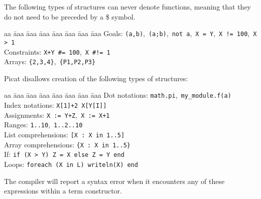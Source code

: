 The following types of structures can never denote functions, meaning that they do not need to be preceded by a \$ symbol.
\begin{tabbing}
aa \= aaa \= aaa \= aaa \=aaa \= aaa \= aaa \= aaa \kill
\> Goals:  \>  \> \> \> \> \> \texttt{(a,b)},\ \texttt{(a;b)},\ \texttt{not a},\ \texttt{X = Y},\ \verb-X != 100-,\ \verb+X > 1+ \\
\> Constraints:  \>  \> \> \> \> \> \verb-X+Y #= 100-,\ \verb+X #!= 1+ \\
\> Arrays:  \>  \> \> \> \> \> \verb+{2,3,4}+,\ \verb+{P1,P2,P3}+ \\
\end{tabbing}
Picat disallows creation of the following types of structures:
\begin{tabbing}
aa \= aaa \= aaa \= aaa \= aaa \= aaa \= aaa \= aaa \kill
\> Dot notations:  \>  \> \> \> \> \> \texttt{math.pi},\ \texttt{my\_module.f(a)} \\
\> Index notations:  \>  \> \> \> \> \> \texttt{X[1]+2}\, \texttt{X[Y[I]]} \\
\> Assignments:  \>  \> \> \> \> \> \texttt{X := Y+Z},\ \texttt{X := X+1} \\
\> Ranges:  \>  \> \> \> \> \> \texttt{1..10},\ \texttt{1..2..10} \\
\> List comprehensions:  \>  \> \> \> \> \> \texttt{[X : X in 1..5]} \\
\> Array comprehensions:  \>  \> \> \> \> \> \texttt{\{X : X in 1..5\}} \\
\> If:  \>  \> \> \> \> \> \texttt{if (X > Y) Z = X else Z = Y end} \\
\> Loops:  \>  \> \> \> \> \> \texttt{foreach (X in L) writeln(X) end } 
\end{tabbing}
The compiler will report a syntax error when it encounters any of these expressions within a term constructor.

